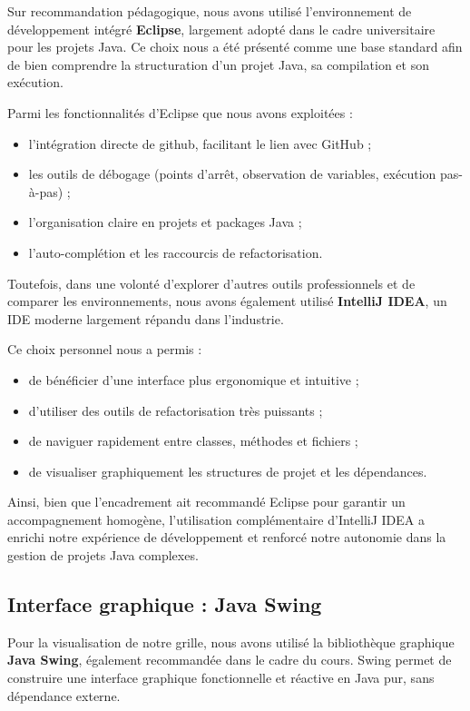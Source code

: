 Sur recommandation pédagogique, nous avons utilisé l’environnement de développement intégré \textbf{Eclipse}, largement adopté dans le cadre universitaire pour les projets Java. Ce choix nous a été présenté comme une base standard afin de bien comprendre la structuration d’un projet Java, sa compilation et son exécution.

Parmi les fonctionnalités d’Eclipse que nous avons exploitées :
\begin{itemize}
    \item l’intégration directe de github, facilitant le lien avec GitHub ;
    \item les outils de débogage (points d’arrêt, observation de variables, exécution pas-à-pas) ;
    \item l’organisation claire en projets et packages Java ;
    \item l’auto-complétion et les raccourcis de refactorisation.
\end{itemize}

Toutefois, dans une volonté d’explorer d’autres outils professionnels et de comparer les environnements, nous avons également utilisé \textbf{IntelliJ IDEA}, un IDE moderne largement répandu dans l’industrie.

Ce choix personnel nous a permis :
\begin{itemize}
    \item de bénéficier d’une interface plus ergonomique et intuitive ;
    \item d’utiliser des outils de refactorisation très puissants ;
    \item de naviguer rapidement entre classes, méthodes et fichiers ;
    \item de visualiser graphiquement les structures de projet et les dépendances.
\end{itemize}

Ainsi, bien que l'encadrement ait recommandé Eclipse pour garantir un accompagnement homogène, l’utilisation complémentaire d’IntelliJ IDEA a enrichi notre expérience de développement et renforcé notre autonomie dans la gestion de projets Java complexes.

\subsection{Interface graphique : Java Swing}

Pour la visualisation de notre grille, nous avons utilisé la bibliothèque graphique \textbf{Java Swing}, également recommandée dans le cadre du cours. Swing permet de construire une interface graphique fonctionnelle et réactive en Java pur, sans dépendance externe.

